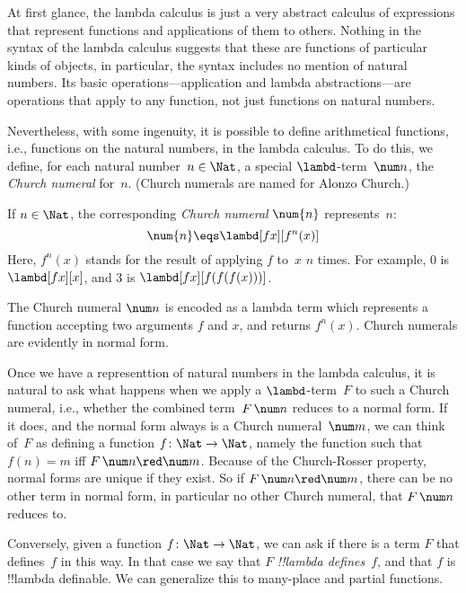 \documentclass[../../../include/open-logic-section]{subfiles}
\begin{document}

At first glance, the lambda calculus is just a very abstract calculus
of expressions that represent functions and applications of them to
others. Nothing in the syntax of the lambda calculus suggests that
these are functions of particular kinds of objects, in particular, the
syntax includes no mention of natural numbers. Its basic
operations---application and lambda abstractions---are operations that
apply to any function, not just functions on natural
numbers.

Nevertheless, with some ingenuity, it is possible to define
arithmetical functions, i.e., functions on the natural numbers, in the
lambda calculus. To do this, we define, for each natural number~$n \in
\Nat$, a special $\lambd$-term~$\num n$, the \emph{Church numeral}
for~$n$. (Church numerals are named for Alonzo Church.)

\begin{defn}
  If $n \in \Nat$, the corresponding \emph{Church numeral} $\num{n}$
  represents~$n$:
  \[
    \num{n} \eqs \lambd[fx][f^n(x)]
  \]
  Here, $f^n(x)$ stands for the result of applying $f$ to~$x$ $n$
  times. For example, $\num{0}$ is $\lambd[fx][x]$, and $\num{3}$ is
  $\lambd[fx][f(f(f(x)))]$.
\end{defn}
  
The Church numeral $\num n$ is encoded as a lambda term which
represents a function accepting two arguments $f$ and $x$, and
returns $f^n(x)$. Church numerals are evidently in normal form.

Once we have a representtion of natural numbers in the lambda
calculus, it is natural to ask what happens when we apply a
$\lambd$-term~$F$ to such a Church numeral, i.e., whether the combined
term~$F\, \num n$ reduces to a normal form. If it does, and the normal
form always is a Church numeral~$\num m$, we can think of~$F$ as
defining a function $f\colon \Nat \to \Nat$, namely the function such
that $f(n) = m$ iff $F\, \num n \red \num m$. Because of the
Church-Rosser property, normal forms are unique if they exist. So if
$F\, \num n \red \num m$, there can be no other term in normal form,
in particular no other Church numeral, that $F \, \num n$ reduces to.

Conversely, given a function $f\colon \Nat \to \Nat$,
we can ask if there is a term $F$ that defines~$f$ in this way. In
that case we say that $F$ \emph{!!{lambda define}s}~$f$, and that $f$ is
!!{lambda definable}. We can generalize this to many-place and partial
functions.
\end{document}
